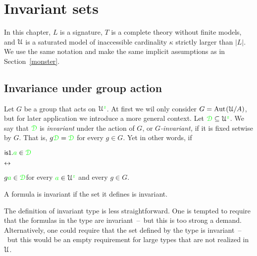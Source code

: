 \chapter{Invariant sets}
\label{invariant}

\def\medrel#1{\parbox[t]{5ex}{$\displaystyle\hfil #1$}}
\def\ceq#1#2#3{\parbox[t]{14ex}{$\displaystyle #1$}\medrel{#2}{$\displaystyle #3$}}

In this chapter, $L$ is a signature, $T$ is a complete theory without finite models, and $\EuScript U$ is a saturated model of inaccessible cardinality $\kappa$ strictly larger than $|L|$.
We use the same notation and make the same implicit assumptions as in Section~\ref{monster}.

\section{Invariance under group action}\label{invariant_sets}

Let $G$ be a group that acts on $\EuScript U^{\color{green} z}$.
At first we wil only consider $G={\rm Aut\kern.15ex}(\EuScript U/A)$, but for later application we introduce a more general context.
Let ${\color{green}\EuScript D}\subseteq\EuScript U^{\color{green} z}$.
We say that ${\color{green}\EuScript D}$ is \emph{invariant\/} under the action of $G$, or \emph{$G$-invariant,} if it is fixed setwise by $G$.
That is, $g{\color{green}\EuScript D}={\color{green}\EuScript D}$ for every $g\in G$.
Yet in other words, if

\ceq{\ssf{is1.}\hfill {\gr a}\in\grD}{\iff}{g{\gr a}\in\grD}\hfill for every ${\color{green} a}\in\EuScript U^{\color{green} z}$ and every $g\in G$.

A formula is invariant if the set it defines is invariant.




The definition of invariant type is less straightforward.
One is tempted to require that the formulas in the type are invariant~--~but this is too strong a demand.
Alternatively, one could require that the set defined by the type is invariant~--~but this would be an empty requirement for large types that are not realized in $\EuScript U$.

